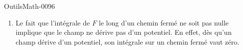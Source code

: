 \begin{corrige}{OutilsMath-0096}
\begin{enumerate}
        \item
            Le fait que l'intégrale de $F$ le long d'un chemin fermé ne soit pas nulle implique que le champ ne dérive pas d'un potentiel. En effet, dès qu'un champ dérive d'un potentiel, son intégrale sur un chemin fermé vaut zéro.
    \end{enumerate}

\end{corrige}

